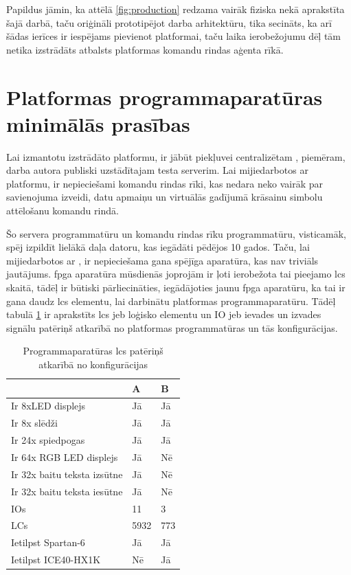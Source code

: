 Papildus jāmin, ka attēlā \ref{fig:production} redzama vairāk fiziska
 nekā aprakstīta šajā darbā, taču oriģināli
prototipējot darba arhitektūru, tika secināts, ka arī šādas ierīces ir iespējams
pievienot platformai, taču laika ierobežojumu dēļ tām netika izstrādāts atbalsts
platformas komandu rindas aģenta rīkā. 

\section{Platformas programmaparatūras minimālās prasības}
\label{sec:minrequirements}

Lai izmantotu izstrādāto platformu, ir jābūt piekļuvei centralizētam
, piemēram, darba autora publiski uzstādītajam testa
serverim. Lai mijiedarbotos ar platformu, ir nepieciešami komandu rindas rīki,
kas nedara neko vairāk par savienojuma izveidi, datu apmaiņu un virtuālās
 gadījumā krāsainu simbolu attēlošanu komandu
rindā.

Šo servera programmatūru un komandu rindas rīku programmatūru, visticamāk, spēj
izpildīt lielākā daļa datoru, kas iegādāti pēdējos 10 gados.  Taču, lai
mijiedarbotos ar , ir nepieciešama
gana spējīga aparatūra, kas nav triviāls jautājums. \gls{fpga} aparatūra
mūsdienās joprojām ir ļoti ierobežota tai pieejamo \gls{lcs} skaitā, tādēļ ir
būtiski pārliecināties, iegādājoties jaunu \gls{fpga} aparatūru, ka tai ir gana
daudz \gls{lcs} elementu, lai darbinātu platformas programmaparatūru. Tādēļ
tabulā \ref{table:lcusage} ir aprakstīts \gls{lcs} jeb loģisko elementu un IO
jeb ievades un izvades signālu patēriņš atkarībā no platformas programmatūras un
tās konfigurācijas.

\begin{table}[H]
    \begin{tabular}{ |p{5cm}|p{3cm}|p{3cm}| }
    \hline
        & A & B\\
    \hline
    Ir 8xLED displejs & Jā & Jā \\
    Ir 8x slēdži & Jā & Jā \\
    Ir 24x spiedpogas & Jā & Jā \\
    Ir 64x RGB LED displejs & Jā & Nē \\
    Ir 32x baitu teksta izsūtne & Jā & Nē \\
    Ir 32x baitu teksta iesūtne & Jā & Nē \\
    \hline
    IOs & 11 & 3 \\
    LCs & 5932 & 773 \\
    \hline
    Ietilpst Spartan-6 & Jā & Jā \\
    Ietilpst ICE40-HX1K & Nē & Jā \\
    \hline
    \end{tabular}
    \centering
    \captionsetup{justification=centering}
    \caption{Programmaparatūras \gls{lcs} patēriņš atkarībā no konfigurācijas}
    \label{table:lcusage}
\end{table}


